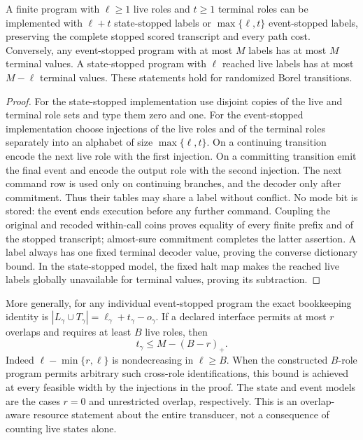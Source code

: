\begin{lemma}\label{lem:packing}
A finite program with $\ell\ge1$ live roles and $t\ge1$ terminal roles can be implemented with $\ell+t$ state-stopped labels or $\max\{\ell,t\}$ event-stopped labels, preserving the complete stopped scored transcript and every path cost. Conversely, any event-stopped program with at most $M$ labels has at most $M$ terminal values. A state-stopped program with $\ell$ reached live labels has at most $M-\ell$ terminal values. These statements hold for randomized Borel transitions.
\end{lemma}
\begin{proof}
For the state-stopped implementation use disjoint copies of the live and terminal role sets and type them zero and one. For the event-stopped implementation choose injections of the live roles and of the terminal roles separately into an alphabet of size $\max\{\ell,t\}$. On a continuing transition encode the next live role with the first injection. On a committing transition emit the final event and encode the output role with the second injection. The next command row is used only on continuing branches, and the decoder only after commitment. Thus their tables may share a label without conflict. No mode bit is stored: the event ends execution before any further command. Coupling the original and recoded within-call coins proves equality of every finite prefix and of the stopped transcript; almost-sure commitment completes the latter assertion. A label always has one fixed terminal decoder value, proving the converse dictionary bound. In the state-stopped model, the fixed halt map makes the reached live labels globally unavailable for terminal values, proving its subtraction.
\end{proof}

More generally, for any individual event-stopped program the exact bookkeeping identity is $|L_\gamma\cup T_\gamma|=\ell_\gamma+t_\gamma-o_\gamma$. If a declared interface permits at most $r$ overlaps and requires at least $B$ live roles, then
\[
 t_\gamma\le M-(B-r)_+.
\]
Indeed $\ell-\min\{r,\ell\}$ is nondecreasing in $\ell\ge B$. When the constructed $B$-role program permits arbitrary such cross-role identifications, this bound is achieved at every feasible width by the injections in the proof. The state and event models are the cases $r=0$ and unrestricted overlap, respectively. This is an overlap-aware resource statement about the entire transducer, not a consequence of counting live states alone.


